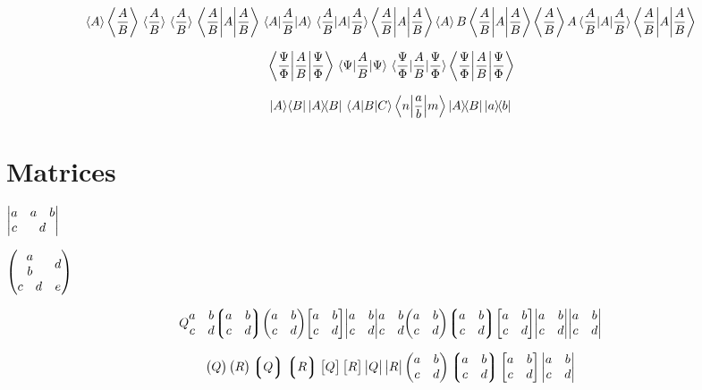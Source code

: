\documentclass{article}
\begin{document}
\[
  \ev{A}
  \ev{\frac{A}{B}}
  \ev*{\frac{A}{B}}
  \ev**{\frac{A}{B}}
  \ev{A}{\frac{A}{B}}
  \ev{\frac{A}{B}}{A}
  \ev*{A}{\frac{A}{B}}
  \ev**{A} {\frac{A}{B}}
  \ev A B
  \ev A {\frac{A}{B}}
  \ev {\frac{A}{B}} A
  \ev* A {\frac{A}{B}}
  \ev** A {\frac{A}{B}}
\]

\[
  \ev{\frac{A}{B}}{\frac{\Psi}{\Phi}}
  \ev{\frac{A}{B}}{{\Psi}}
  \ev*{\frac{A}{B}}{\frac{\Psi}{\Phi}}
  \ev**{\frac{A}{B}}{\frac{\Psi}{\Phi}}
\]


\[
  \left\vert A \middle\rangle\middle\langle B\right\vert
  \ketbra{A}{B}
  \mel A B C
  \mel**{n}{\frac{a}{b}}{m}
  \outerproduct{A}{B}
  \dyad{a}{b}
\]


\newpage


\section*{Matrices}

$  \mqty*|a & \mqty*{a & b} \\ c& d| $

$
\begin{pmatrix}
  \mqty{a\\b} & d\\
  \mqty{c & d} & e
\end{pmatrix}
$


\[
  \matrixquantity{Q}
  \matrixquantity*{a & b \\ c & d}
  \matrixquantity*(a & b \\ c & d)
  \matrixquantity(a & b \\ c & d)
  \matrixquantity[a & b \\ c & d]
  \matrixquantity|a & b \\ c & d|
  \mqty{a & b \\ c & d}
  \mqty(a & b \\ c & d)
  \mqty*(a & b \\ c & d)
  \mqty[a & b \\ c & d]
  \mqty|a & b \\ c & d|
  \mqty*|a & b\\ c& d|
\]

\[
  \pmqty{Q} \mqty(R)
  \Pmqty{Q} \mqty*(R)
  \bmqty{Q} \mqty[R]
  \vmqty{Q} \mqty|R|
  \pmqty{a & b \\ c & d}
  \Pmqty{a & b \\ c & d}
  \bmqty{a & b \\ c & d}
  \vmqty{a & b \\ c & d}
\]
\end{document}
